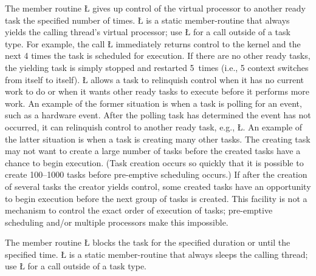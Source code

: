 \documentclass[openright,twoside]{report}
\begin{document}
The member routine \LGinlinetrue\LGbegin\lgrinde\L{}\endlgrinde\LGend{} gives up control of the virtual processor to another ready task the specified number of times.
\LGinlinetrue\LGbegin\lgrinde\L{}\endlgrinde\LGend{} is a static member-routine that always yields the calling thread's virtual processor;
use \LGinlinetrue\LGbegin\lgrinde\L{}\endlgrinde\LGend{} for a call outside of a task type.
For example, the call \LGinlinetrue\LGbegin\lgrinde\L{}\endlgrinde\LGend{} immediately returns control to the \uC kernel and the next 4 times the task is scheduled for execution.
If there are no other ready tasks, the yielding task is simply stopped and restarted 5~times (i.e., 5 context switches from itself to itself).
\LGinlinetrue\LGbegin\lgrinde\L{}\endlgrinde\LGend{} allows a task to relinquish control when it has no current work to do or when it wants other ready tasks to execute before it performs more work.
An example of the former situation is when a task is polling for an event, such as a hardware event.
After the polling task has determined the event has not occurred, it can relinquish control to another ready task, e.g., \LGinlinetrue\LGbegin\lgrinde\L{}\endlgrinde\LGend{}.
An example of the latter situation is when a task is creating many other tasks.
The creating task may not want to create a large number of tasks before the created tasks have a chance to begin execution.
(Task creation occurs so quickly that it is possible to create 100--1000 tasks before pre-emptive scheduling occurs.)
If after the creation of several tasks the creator yields control, some created tasks have an opportunity to begin execution before the next group of tasks is created.
This facility is not a mechanism to control the exact order of execution of tasks;
pre-emptive scheduling and/or multiple processors make this impossible.

The member routine \LGinlinetrue\LGbegin\lgrinde\L{}\endlgrinde\LGend{} blocks the task for the specified duration or until the specified time.
\LGinlinetrue\LGbegin\lgrinde\L{}\endlgrinde\LGend{} is a static member-routine that always sleeps the calling thread;
use \LGinlinetrue\LGbegin\lgrinde\L{}\endlgrinde\LGend{} for a call outside of a task type.
\end{document}
